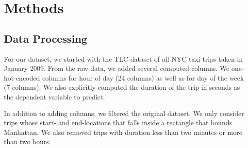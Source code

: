 \documentclass{article}
\begin{document}







\section{Methods}

% 
% 
% 

\subsection{Data Processing}

For our dataset, we started with the TLC dataset of all NYC taxi trips taken in
January 2009. From the raw data, we added several computed columns.
We one-hot-encoded columns for hour of day (24 columns) as well as for
day of the week (7 columns). We also explicitly computed the duration of the trip  in seconds as the dependent variable to predict.

In addition to adding columns, we filtered the original dataset. We only consider trips
whose start- and end-locations that falls inside a rectangle that bounds Manhattan. We also removed trips with duration less than two minutes or more than two hours.
\end{document}
